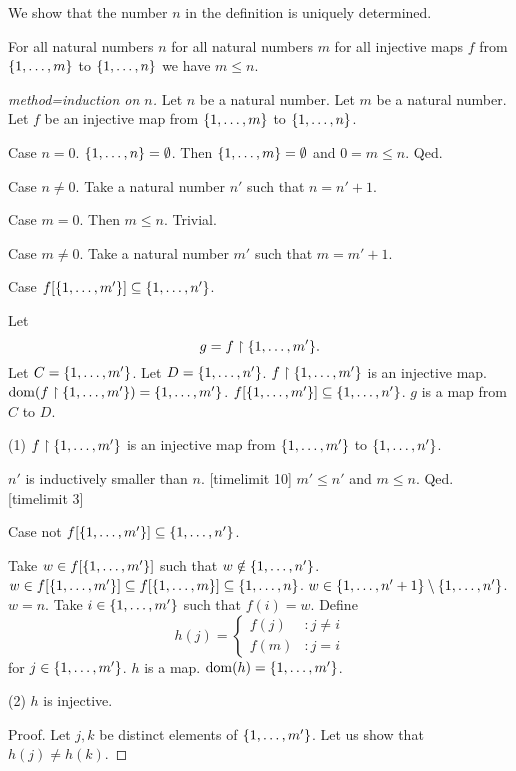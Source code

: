 \documentclass{article}
\begin{document}
  We show that the number $n$ in the definition is uniquely
  determined.
  \begin{forthel}

  \begin{lemma}
  For all natural numbers $n$
  for all natural numbers $m$
  for all injective maps $f$ from
  $\{1,\dots,m\}$ to $\{1,\dots,n\}$ we have $m \leq n$.
  \end{lemma}
  \begin{proof}[method=induction on $n$]
  Let $n$ be a natural number.
  Let $m$ be a natural number.
  Let $f$ be an injective map from $\{1,\dots,m\}$ to $\{1,\dots,n\}$.

  Case $n=0$. $\{1,\dots,n\} = \emptyset$. Then $\{1,\dots,m\} = \emptyset$ and
  $0 = m \leq n$. Qed.

  Case $n \neq 0$.
  Take a natural number $n'$ such that $n = n' + 1$.

  Case $m = 0$. Then $m \leq n$. Trivial.

  Case $m \neq 0$.
  Take a natural number $m'$ such that $m = m' + 1$.

  Case $f[\{1,\dots,m'\}] \subseteq \{1,\dots,n'\}$.

  Let
$$g = f \upharpoonright \{1,\dots,m'\}.$$
  Let $C = \{1,\dots,m'\}$. Let $D = \{1,\dots,n'\}$.
  $f \upharpoonright \{1,\dots,m'\}$ is an injective map.
  $\operatorname{dom}(f \upharpoonright \{1,\dots,m'\}) = \{1,\dots,m'\}$.
  $f[\{1,\dots,m'\}] \subseteq \{1,\dots,n'\}$.
  $g$ is a map
  from $C$ to $D$.

  (1) $f \upharpoonright \{1,\dots,m'\}$ is an injective map
  from $\{1,\dots,m'\}$ to $\{1,\dots,n'\}$.

  $n'$ is inductively smaller than $n$.
[timelimit 10] %
  $m' \leq n'$ and $m \leq n$. Qed.
[timelimit 3] %

  Case not $f[\{1,\dots,m'\}] \subseteq \{1,\dots,n'\}$.

  Take $w \in f[\{1,\dots,m'\}]$ such that $w \notin \{1,\dots,n'\}$.
  $w \in f[\{1,\dots,m'\}] \subseteq f[\{1,\dots,m\}] \subseteq \{1,\dots,n\}$.
  $w \in \{1,\dots,n'+1\} \setminus \{1,\dots,n'\}$.
  $w = n$.
  Take $i \in \{1,\dots,m'\}$ such that $f(i) = w$.
  Define
  \[h(j) =
    \begin{cases}
    f(j)  & : j \neq i \\
    f(m) & : j = i
    \end{cases} \]
  for $j \in \{1,\dots,m'\}$.
  $h$ is a map. $\operatorname{dom}(h) = \{1,\dots,m'\}$.

  (2) $h$ is injective.

  Proof.
  Let $j,k$ be distinct elements of $\{1,\dots,m'\}$.
  Let us show that $h(j) \neq h(k)$.


\end{proof}
\end{forthel}
\end{document}
